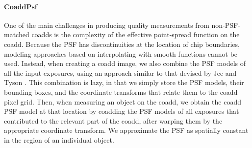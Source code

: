 \documentclass[12pt]{article}
\begin{document}
\paragraph{CoaddPsf}
\label{alg:coaddPsf}

One of the main challenges in producing quality measurements from
non-PSF-matched coadds is the complexity of the effective point-spread
function on the coadd.  Because the PSF has discontinuities at the
location of chip boundaries, modeling approaches based on
interpolating with smooth functions cannot be used.  Instead, when
creating a coadd image, we also combine the PSF models of all the
input exposures, using an approach similar to that devised by
Jee and Tyson \cite{JeeTyson11}.  This combination is lazy, in that we simply store the
PSF models, their bounding boxes, and the coordinate transforms that
relate them to the coadd pixel grid.  Then, when measuring an object
on the coadd, we obtain the coadd PSF model at that location by coadding the
PSF models of all exposures that contributed to the relevant part of
the coadd, after warping them by the appropriate coordinate
transform.  We approximate the PSF as spatially constant in the region
of an individual object.

\end{document}
